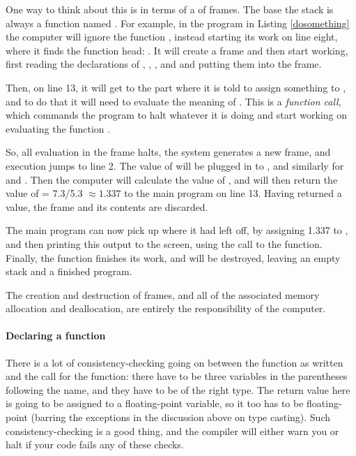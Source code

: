 \lstset{numbers=left, numberstyle=\scshape}
\lstset{numbers=none}

One way to think about this is in terms of a  of frames.
The base the stack is always a function named .  For example,
in the program in Listing \ref{dosomething} the computer will ignore the
function , instead starting its work on line eight,
where it finds the  function head: . It
will create a  frame and then start working, first reading the
declarations of , , , and 
and putting them into the frame.

Then, on line 13, it will get to the part where it is told to
assign something to , and to do that it will need
to evaluate the meaning of . This is a {\em function call}, which commands the program
to halt whatever it is doing and start working on evaluating the
function . 

So, all evaluation in the  frame halts, 
the system generates a new frame, and execution jumps to 
line 2. The value of 
will be plugged in to , and similarly for  and
. Then the computer will calculate the value of , and will then return the value of  =
7.3/5.3 $\approx 1.337$ to the main program on line 13. Having returned
a value, the  frame and its contents are
discarded.

The main program can now pick up where it had left off, by assigning
1.337 to , and then printing this output to the screen, using
the call to the  function.  Finally, the  function 
finishes its work, and will be destroyed, leaving an empty stack and a
finished program.

The creation and destruction of frames, and all of the associated
memory allocation and deallocation, are entirely the responsibility of
the computer.   

\paragraph{Declaring a function} 
There is a lot of consistency-checking going on between the function as
written and the call for the function: there have to be three variables
in the parentheses following the name, and they have to be of the right
type. The return value here is going to be assigned to a floating-point
variable, so it too has to be floating-point (barring the exceptions in
the discussion above on type casting).
Such consistency-checking is a good thing, and
the compiler will either warn you or halt if your code fails any of these checks.

